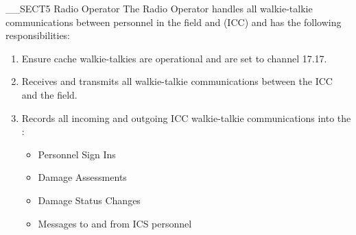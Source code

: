 __SECT5{ Radio Operator
\label{sec:RadioOperator} }
The Radio Operator handles all walkie-talkie communications 
between personnel in the field and \IncidentCommandCenter(ICC)
and has the following responsibilities:
\begin{enumerate}
\item Ensure cache walkie-talkies are operational and are set to channel 17.17. 
\item Receives and transmits all walkie-talkie communications between the ICC and the field. 
\item Records all incoming and outgoing ICC walkie-talkie communications into the \ICSDatabase:
\begin{itemize}
\item Personnel Sign Ins
\item Damage Assessments
\item Damage Status Changes
\item Messages to and from ICS personnel
\end{itemize}
\end{enumerate}
